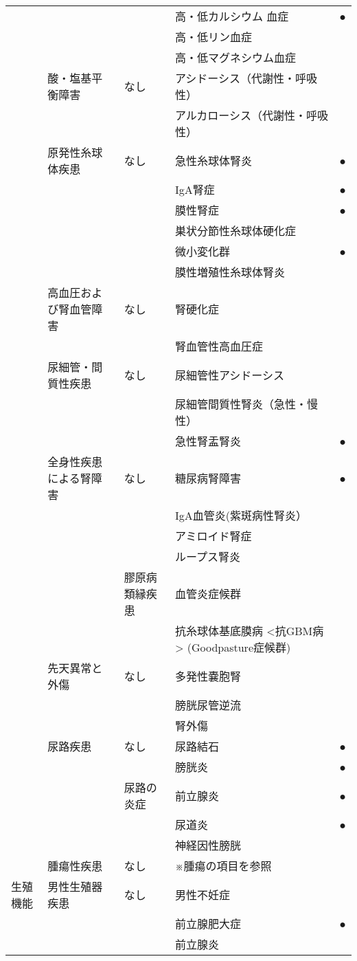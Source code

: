 \begin{xltabular}{\linewidth}{XXXXX}
 &  &  & 高・低カルシウム 血症 & ● \\
 &  &  & 高・低リン血症 &  \\
 &  &  & 高・低マグネシウム血症 &  \\
 & 酸・塩基平衡障害 & なし & アシドーシス（代謝性・呼吸性） &  \\
 &  &  & アルカローシス（代謝性・呼吸性） &  \\
 & 原発性糸球体疾患 & なし & 急性糸球体腎炎 & ● \\
 &  &  & IgA腎症 & ● \\
 &  &  & 膜性腎症 & ● \\
 &  &  & 巣状分節性糸球体硬化症 &  \\
 &  &  & 微小変化群 & ● \\
 &  &  & 膜性増殖性糸球体腎炎 &  \\
 & 高血圧および腎血管障害 & なし & 腎硬化症 &  \\
 &  &  & 腎血管性高血圧症 &  \\
 & 尿細管・間質性疾患 & なし & 尿細管性アシドーシス &  \\
 &  &  & 尿細管間質性腎炎（急性・慢性） &  \\
 &  &  & 急性腎盂腎炎 & ● \\
 & 全身性疾患による腎障害 & なし & 糖尿病腎障害 & ● \\
 &  &  & IgA血管炎(紫斑病性腎炎） &  \\
 &  &  & アミロイド腎症 &  \\
 &  &  & ループス腎炎 &  \\
 &  & 膠原病類縁疾患 & 血管炎症候群 &  \\
 &  &  & 抗糸球体基底膜病 <抗GBM病> (Goodpasture症候群) &  \\
 & 先天異常と外傷 & なし & 多発性嚢胞腎 &  \\
 &  &  & 膀胱尿管逆流 &  \\
 &  &  & 腎外傷 &  \\
 & 尿路疾患 & なし & 尿路結石 & ● \\
 &  &  & 膀胱炎 & ● \\
 &  & 尿路の炎症 & 前立腺炎 & ● \\
 &  &  & 尿道炎 & ● \\
 &  &  & 神経因性膀胱 &  \\
 & 腫瘍性疾患 & なし & ※腫瘍の項目を参照 &  \\
生殖機能 & 男性生殖器疾患 & なし & 男性不妊症 &  \\
 &  &  & 前立腺肥大症 & ● \\
 &  &  & 前立腺炎 &  \\

\end{xltabular}
